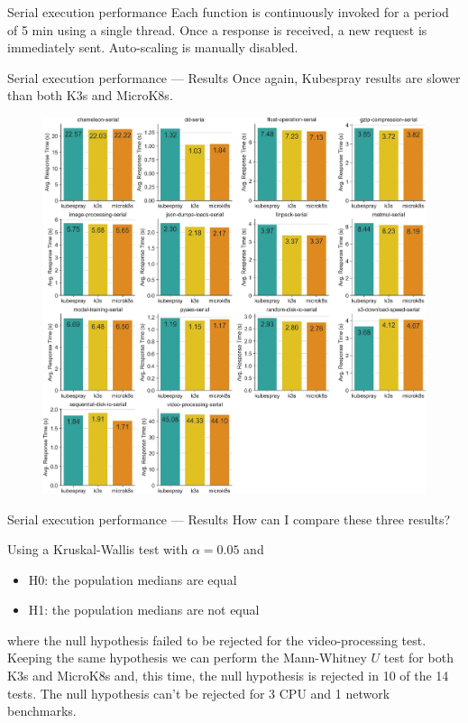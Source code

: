 \begin{frame}{Serial execution performance}
Each function is continuously invoked for a period of 5 min using a single thread. Once a response is received, a new request is immediately sent. Auto-scaling is manually disabled.
\end{frame}

\begin{frame}{Serial execution performance — Results}
Once again, Kubespray results are slower than both K3s and MicroK8s.

\begin{figure}
    \centering
    \includegraphics[width=0.6\linewidth]{static/11227_2022_4430_Fig5_HTML.jpg}
\end{figure}
\end{frame}

\begin{frame}{Serial execution performance — Results}
How can I compare these three results?
\pause

Using a Kruskal-Wallis test with \(\alpha = 0.05\) and 
\begin{itemize}
    \item H0: the population medians are equal
    \item H1: the population medians are not equal
\end{itemize}

where the null hypothesis failed to be rejected for the video-processing test. \pause
\\ Keeping the same hypothesis we can perform the Mann-Whitney \(U\) test for both K3s and MicroK8s and, this time, the null hypothesis is rejected in 10 of the 14 tests. The null hypothesis can't be rejected for 3 CPU and 1 network benchmarks.
\end{frame}

